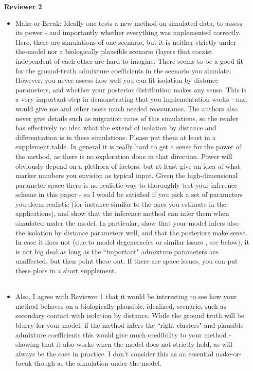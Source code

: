 \documentclass[11pt]{letter}
\newcommand{\gb}[1]{{\bf\color{black}{#1}}}
\begin{document}
\textbf{Reviewer 2}\\
\begin{itemize}
\item Make-or-Break:
Ideally one tests a new method on simulated data, to assess its power -
and importantly whether everything was implemented correctly.
Here, there are simulations of one scenario, but it is neither strictly under-the-model 
nor a biologically plausible scenario (layers that coexist independent of each other are hard to imagine.
There seems to be a good fit for the ground-truth admixture coefficients in the scenario you simulate. 
However, you never assess how well you can fit isolation by distance parameters, 
and whether your posterior distribution makes any sense. 
This is a very important step in demonstrating that you implementation works - 
and would give me and other users much needed reassurance.
The authors also never give details such as migration rates of this simulations, 
so the reader has effectively no idea what the extend of isolation by distance and differentiation is in these simulations. 
Please put them at least in a supplement table. 
In general it is really hard to get a sense for the power of the method, 
as there is no exploration done in that direction. 
Power will obviously depend on a plethora of factors, 
but at least give an idea of what marker numbers you envision as typical input.
Given the high-dimensional parameter space there is no realistic way to thoroughly test your inference scheme in this paper - 
so I would be satisfied if you pick a set of parameters you deem realistic 
(for instance similar to the ones you estimate in the applications), 
and show that the inference method can infer them when simulated under the model. 
In particular, show that your model infers also the isolation by distance parameters well, 
and that the posteriors make sense. 
In case it does not (due to model degeneracies or similar issues , see below), 
it is not big deal as long as the ``important" admixture parameters are unaffected, 
but then point these out.
If there are space issues, you can put these plots in a short supplement.\\\\
\gb{RESPONSE.}


\item Also, I agree with Reviewer 1 that it would be interesting to see how your method behaves on a biologically plausible, 
idealized, scenario, such as secondary contact with isolation by distance. 
While the ground truth will be blurry for your model, 
if the method infers the ``right clusters" and plausible admixture coefficients 
this would give much credibility to your method - 
showing that it also works when the model does not strictly hold, 
as will always be the case in practice. 
I don't consider this as an essential make-or-break though as the simulation-under-the-model.\\\\
\gb{RESPONSE.}


\end{itemize}
\end{document}
